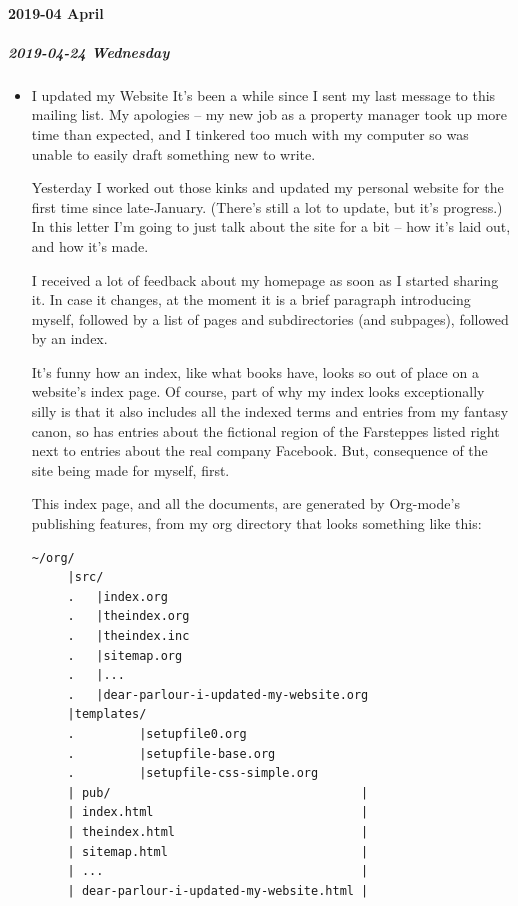 \documentclass[11pt]{article}
\begin{document}
\paragraph*{2019-04 April}
\label{sec:org41c344e}
\startcontents[level-4]
\subparagraph*{2019-04-24 Wednesday}
\label{sec:orgd05cb36}
\begin{itemize}
\item I updated my Website
\label{sec:org6cca72a}
It’s been a while since I sent my last message to this mailing list. My apologies – my new job as a property manager took up more time than expected, and I tinkered too much with my computer so was unable to easily draft something new to write.

Yesterday I worked out those kinks and updated my personal website for the first time since late-January. (There’s still a lot to update, but it’s progress.) In this letter I’m going to just talk about the site for a bit – how it’s laid out, and how it’s made.

I received a lot of feedback about my homepage as soon as I started sharing it. In case it changes, at the moment it is a brief paragraph introducing myself, followed by a list of pages and subdirectories (and subpages), followed by an index.

It’s funny how an index, like what books have, looks so out of place on a website’s index page. Of course, part of why my index looks exceptionally silly is that it also includes all the indexed terms and entries from my fantasy canon, so has entries about the fictional region of the Farsteppes listed right next to entries about the real company Facebook. But, consequence of the site being made for myself, first.

This index page, and all the documents, are generated by Org-mode’s publishing features, from my org directory that looks something like this:
\begin{verbatim}
~/org/
     |src/
     .   |index.org
     .   |theindex.org
     .   |theindex.inc
     .   |sitemap.org
     .   |...
     .   |dear-parlour-i-updated-my-website.org
     |templates/
     .         |setupfile0.org
     .         |setupfile-base.org
     .         |setupfile-css-simple.org
     | pub/                                   |
     | index.html                             |
     | theindex.html                          |
     | sitemap.html                           |
     | ...                                    |
     | dear-parlour-i-updated-my-website.html |
\end{verbatim}
\end{itemize}
\stopcontents[level-4]
\stopcontents[level-3]
\end{document}
